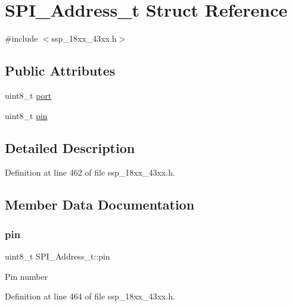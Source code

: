 \hypertarget{struct_s_p_i___address__t}{}\section{S\+P\+I\+\_\+\+Address\+\_\+t Struct Reference}
\label{struct_s_p_i___address__t}


{\ttfamily \#include $<$ssp\+\_\+18xx\+\_\+43xx.\+h$>$}

\subsection*{Public Attributes}
\begin{DoxyCompactItemize}
\item 
uint8\+\_\+t \hyperlink{struct_s_p_i___address__t_a64ccbaf37a32da0f13b46325b4b42c4d}{port}
\item 
uint8\+\_\+t \hyperlink{struct_s_p_i___address__t_aa89aa381abb683131e6d7b3158b25155}{pin}
\end{DoxyCompactItemize}


\subsection{Detailed Description}


Definition at line 462 of file ssp\+\_\+18xx\+\_\+43xx.\+h.



\subsection{Member Data Documentation}
\mbox{\label{struct_s_p_i___address__t_aa89aa381abb683131e6d7b3158b25155}} 
\subsubsection{\texorpdfstring{pin}{pin}}
{\footnotesize\ttfamily uint8\+\_\+t S\+P\+I\+\_\+\+Address\+\_\+t\+::pin}

Pin number 

Definition at line 464 of file ssp\+\_\+18xx\+\_\+43xx.\+h.

\mbox{\label{struct_s_p_i___address__t_a64ccbaf37a32da0f13b46325b4b42c4d}} 
